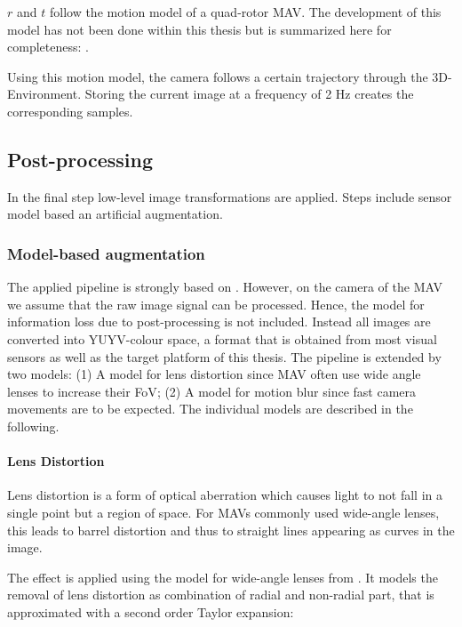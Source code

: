 $r$ and $t$ follow the motion model of a quad-rotor \ac{MAV}.  The development of this model has not been done within this thesis but is summarized here for completeness: .

Using this motion model, the camera follows a certain trajectory through the 3D-Environment. Storing the current image at a frequency of 2 Hz creates the corresponding samples.
	
\subsection{Post-processing}

In the final step low-level image transformations are applied. Steps include sensor model based an artificial augmentation.

\subsubsection{Model-based augmentation}

The applied pipeline is strongly based on \cite{Carlson2018}. However, on the camera of the \ac{MAV} we assume that the raw image signal can be processed. Hence, the model for information loss due to post-processing is not included. Instead all images are converted into YUYV-colour space, a format that is obtained from most visual sensors as well as the target platform of this thesis. The pipeline is extended by two models: (1) A model for lens distortion since \ac{MAV} often use wide angle lenses to increase their \ac{FoV}; (2) A model for motion blur since fast camera movements are to be expected. The individual models are described in the following.

\paragraph{Lens Distortion}

Lens distortion is a form of optical aberration which causes light to not fall in a single point but a region of space. For \acp{MAV} commonly used wide-angle lenses, this leads to barrel distortion and thus to straight lines appearing as curves in the image.

The effect is applied using the model for wide-angle lenses from \cite{Vass}. It models the removal of lens distortion as combination of radial and non-radial part, that is approximated with a second order Taylor expansion:

